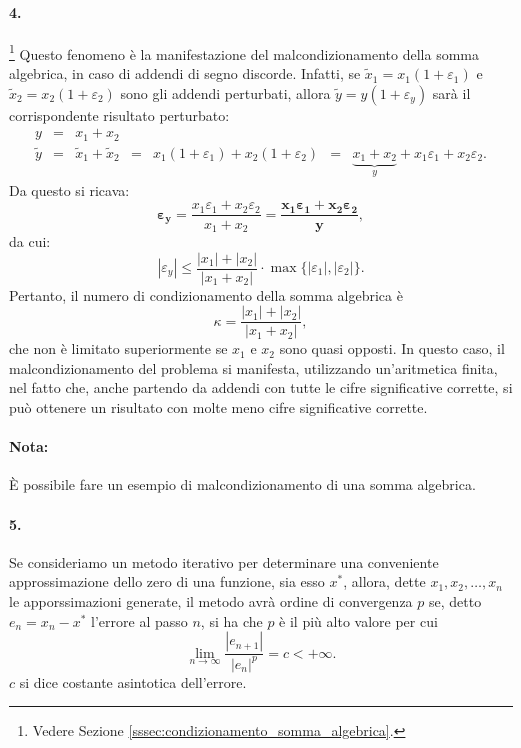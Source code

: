 \paragraph{4.}\footnote{Vedere Sezione \ref{sssec:condizionamento_somma_algebrica}.} Questo fenomeno è la manifestazione del malcondizionamento della somma algebrica, in caso di addendi di segno discorde. Infatti, se $\tilde x_1 = x_1 (1+\varepsilon_1)$ e $\tilde x_2 = x_2 (1 + \varepsilon_2)$ sono gli addendi perturbati, allora $\tilde y = y (1 + \varepsilon_y)$ sarà il corrispondente risultato perturbato:
\begin{equation*}
	\begin{matrix}
		y &=& x_1 + x_2\\
		\tilde y &=& \tilde x_1 + \tilde x_2 &=& x_1(1+\varepsilon_1) + x_2 (1+\varepsilon_2) &=& \underbrace{x_1 + x_2}_{y} + x_1 \varepsilon_1 + x_2 \varepsilon_2.
	\end{matrix}
\end{equation*}
Da questo si ricava:
\begin{equation*}
	\boldsymbol{\varepsilon_y} = \frac{x_1\varepsilon_1+x_2\varepsilon_2}{x_1+x_2}= \boldsymbol{\frac{x_1\varepsilon_1+x_2\varepsilon_2}{y}},
\end{equation*}
da cui:
\begin{equation*}
	|\varepsilon_y|\leq \frac{|x_1|+|x_2|}{|x_1+x_2|} \cdot \max{\{|\varepsilon_1|,|\varepsilon_2|\}}.
\end{equation*}
Pertanto, il numero di condizionamento della somma algebrica è
\begin{equation*}
	\kappa=\frac{|x_1|+|x_2|}{|x_1+x_2|},
\end{equation*}
che non è limitato superiormente se $x_1$ e $x_2$ sono quasi opposti. In questo caso, il malcondizionamento del problema si manifesta, utilizzando un'aritmetica finita, nel fatto che, anche partendo da addendi con tutte le cifre significative corrette, si può ottenere un risultato con molte meno cifre significative corrette.
\paragraph{Nota:} È possibile fare un esempio di malcondizionamento di una somma algebrica.

\paragraph{5.} Se consideriamo un metodo iterativo per determinare una conveniente approssimazione dello zero di una funzione, sia esso $x^*$, allora, dette $x_1, x_2,\hdots, x_n$ le apporssimazioni generate, il metodo avrà ordine di convergenza $p$ se, detto $e_n=x_n-x^*$ l'errore al passo $n$, si ha che  $p$ è il più alto valore per cui
\begin{equation*}
	\lim_{n\rightarrow\infty}\frac{|e_{n+1}|}{|e_n|^p}=c<+\infty.
\end{equation*}
$c$ si dice costante asintotica dell'errore.
